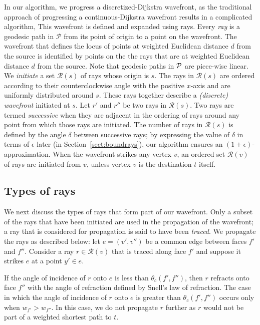 \documentclass[11pt]{article}
\def\calP{\mathcal{P}}
\def\calR{\mathcal{R}}
\begin{document}
In our algorithm, we progress a discretized-Dijkstra wavefront, as the traditional approach of
progressing a continuous-Dijkstra wavefront results in a complicated algorithm, 
This wavefront is defined and expanded using rays.
Every {\it ray} is a geodesic path in $\calP$ from its point of origin to a point on the wavefront.
The wavefront that defines the locus of points at weighted Euclidean distance $d$ from the source is identified by points on the the rays that are at weighted Euclidean distance $d$ from the source.
Note that geodesic paths in ${\cal P}$ are piece-wise linear.
We {\it initiate} a set $\calR(s)$ of rays whose origin is $s$.
The rays in $\calR(s)$ are ordered according to their counterclockwise angle with the positive $x$-axis and are uniformly distributed around $s$.
These rays together describe  a {\it (discrete) wavefront} initiated at $s$.
Let $r'$ and $r''$ be two rays in $\calR(s)$. Two rays are termed {\it successive} when
they are adjacent in the ordering of rays around any point from which those rays are initiated.
The number of rays in $\calR(s)$ is defined by the angle $\delta$ between successive rays; by expressing the value of $\delta$ in terms of $\epsilon$ later (in Section~\ref{sect:boundrays}), our algorithm ensures an $(1+\epsilon)$-approximation.
When the wavefront strikes any vertex $v$, an ordered set $\calR(v)$ of rays are initiated from $v$, unless vertex $v$ is the destination $t$ itself.

\subsection{Types of rays}

We next discuss the types of rays that form part of our wavefront.
Only a subset of the  rays that have been initiated are  used in the propagation of the wavefront; a ray that is considered for propagation is said to have been {\it traced}.
We propagate the rays as described below:
let $e=(v',v'')$ be a common edge between faces $f'$ and $f''$.
Consider a ray $r \in \calR(v)$ that is traced along face $f'$ and suppose it strikes $e$ at a point $y' \in e$.

If the angle of incidence of $r$ onto $e$ is less than $\theta_c(f', f'')$, then $r$ refracts onto face $f''$ with the angle of refraction defined by Snell's law of refraction.
The case in which the angle of incidence of $r$ onto $e$ is greater than $\theta_c(f', f'')$ occurs only when $w_{f'} > w_{f''}$.
In this case, we do not propagate $r$ further as $r$ would not be part of a weighted shortest path to $t$.
\end{document}
